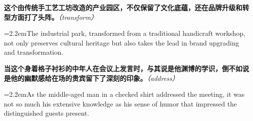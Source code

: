 \documentclass[11pt,a4paper]{article}
\newcommand{\num}[1]{\makebox[1.9em][r]{#1.}\hspace{0.3em}}
\newcommand{\prompt}[1]{\emph{\textcolor{tipblue}{\small（#1）}}}
\begin{document}
\begin{minipage}{\linewidth}

\num{39}\textbf{这个由传统手工艺工坊改造的产业园区，不仅保留了文化底蕴，还在品牌升级和转型方面打了头阵。}\prompt{transform}

\vspace{0.15em}

\noindent\hangindent=2.2em\hspace{2.2em}The industrial park, transformed from a traditional handicraft workshop, not only preserves cultural heritage but also takes the lead in brand upgrading and transformation.

\end{minipage}

\begin{minipage}{\linewidth}

\num{40}\textbf{当这个身着格子衬衫的中年人在会议上发言时，与其说是他渊博的学识，倒不如说是他的幽默感给在场的贵宾留下了深刻的印象。}\prompt{address}

\vspace{0.15em}

\noindent\hangindent=2.2em\hspace{2.2em}As the middle-aged man in a checked shirt addressed the meeting, it was not so much his extensive knowledge as his sense of humor that impressed the distinguished guests present.

\end{minipage}
\end{document}
